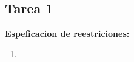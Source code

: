 \documentclass{report}
\begin{document}
	
	
	
	\begin{center}
		\section*{\LARGE{Tarea 1}}
	\end{center}

    \begin{center}
		\LARGE{\textbf{Espeficacion de reestriciones:}}\\
        \normalsize
	\end{center}
        \begin{enumerate}
            \item 
        \end{enumerate}
    \newpage
    
\printbibliography
  
\end{document}
